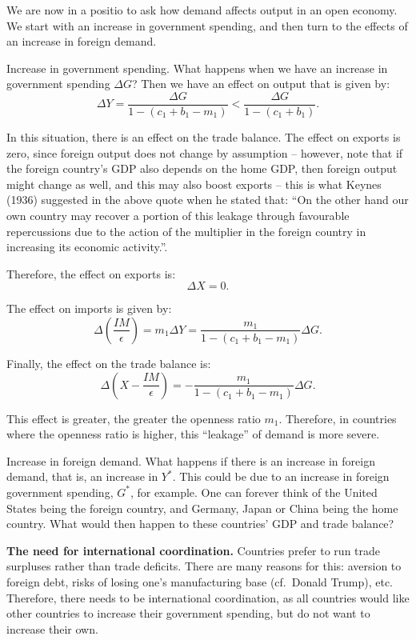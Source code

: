 \documentclass[]{book}
\theoremstyle{definition}
\theoremstyle{definition}
\theoremstyle{definition}
\theoremstyle{remark}
\begin{document}
We are now in a positio to ask how demand affects output in an open
economy. We start with an increase in government spending, and then turn
to the effects of an increase in foreign demand.

Increase in government spending. What happens when we have an increase
in government spending \(\Delta G\)? Then we have an effect on output
that is given by:
\[\Delta Y=\frac{\Delta G}{1-\left(c_{1}+b_{1}-m_{1}\right)}<\frac{\Delta G}{1-\left(c_{1}+b_{1}\right)}.\]

In this situation, there is an effect on the trade balance. The effect
on exports is zero, since foreign output does not change by assumption
-- however, note that if the foreign country's GDP also depends on the
home GDP, then foreign output might change as well, and this may also
boost exports -- this is what Keynes (1936) suggested in the above quote
when he stated that: ``On the other hand our own country may recover a
portion of this leakage through favourable repercussions due to the
action of the multiplier in the foreign country in increasing its
economic activity.''.

Therefore, the effect on exports is: \[\Delta X=0.\]

The effect on imports is given by:
\[\Delta\left(\frac{IM}{\epsilon}\right)=m_{1}\Delta Y=\frac{m_{1}}{1-\left(c_{1}+b_{1}-m_{1}\right)}\Delta G.\]

Finally, the effect on the trade balance is:
\[\Delta\left(X-\frac{IM}{\epsilon}\right)=-\frac{m_{1}}{1-\left(c_{1}+b_{1}-m_{1}\right)}\Delta G.\]

This effect is greater, the greater the openness ratio \(m_{1}\).
Therefore, in countries where the openness ratio is higher, this
``leakage'' of demand is more severe.

Increase in foreign demand. What happens if there is an increase in
foreign demand, that is, an increase in \(Y^{*}\). This could be due to
an increase in foreign government spending, \(G^{*}\), for example. One
can forever think of the United States being the foreign country, and
Germany, Japan or China being the home country. What would then happen
to these countries' GDP and trade balance?

\textbf{The need for international coordination.} Countries prefer to
run trade surpluses rather than trade deficits. There are many reasons
for this: aversion to foreign debt, risks of losing one's manufacturing
base (cf.~Donald Trump), etc. Therefore, there needs to be international
coordination, as all countries would like other countries to increase
their government spending, but do not want to increase their own.
\end{document}
